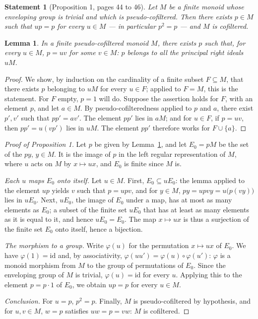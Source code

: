 \documentclass[11pt]{article}
\theoremstyle{plain}
\newtheorem*{enonce}{Statement}
\newtheorem{lemme}{Lemma}[section]
\theoremstyle{definition}
\theoremstyle{remark}
\begin{document}
\begin{enonce}[Proposition 1, pages 44 to 46]
Let $M$ be a finite monoid whose enveloping group is trivial and which is pseudo-cofiltered. Then there exists $p \in M$ such that $up = p$ for every $u \in M$ --- in particular $p^2 = p$ --- and $M$ is cofiltered.
\end{enonce}

\begin{lemme}\label{lem:158-etape1}
In a finite pseudo-cofiltered monoid $M$, there exists $p$ such that, for every $u \in M$, $p = uv$ for some $v \in M$: $p$ belongs to all the principal right ideals $uM$.
\end{lemme}

\begin{proof}
We show, by induction on the cardinality of a finite subset $F \subseteq M$, that there exists $p$ belonging to $uM$ for every $u \in F$; applied to $F = M$, this is the statement. For $F$ empty, $p = 1$ will do. Suppose the assertion holds for $F$, with an element $p$, and let $a \in M$. By pseudo-cofilteredness applied to $p$ and $a$, there exist $p', v'$ such that $pp' = av'$. The element $pp'$ lies in $aM$; and for $u \in F$, if $p = uv$, then $pp' = u(vp')$ lies in $uM$. The element $pp'$ therefore works for $F \cup \{a\}$.
\end{proof}

\begin{proof}[Proof of Proposition 1]
Let $p$ be given by Lemma~\ref{lem:158-etape1}, and let $E_0 = pM$ be the set of the $py$, $y \in M$. It is the image of $p$ in the left regular representation of $M$, where $u$ acts on $M$ by $x \mapsto ux$, and $E_0$ is finite since $M$ is.

\emph{Each $u$ maps $E_0$ onto itself.} Let $u \in M$. First, $E_0 \subseteq uE_0$: the lemma applied to the element $up$ yields $v$ such that $p = upv$, and for $y \in M$, $py = upvy = u\bigl(p(vy)\bigr)$ lies in $uE_0$. Next, $uE_0$, the image of $E_0$ under a map, has at most as many elements as $E_0$; a subset of the finite set $uE_0$ that has at least as many elements as it is equal to it, and hence $uE_0 = E_0$. The map $x \mapsto ux$ is thus a surjection of the finite set $E_0$ onto itself, hence a bijection.

\emph{The morphism to a group.} Write $\varphi(u)$ for the permutation $x \mapsto ux$ of $E_0$. We have $\varphi(1) = \mathrm{id}$ and, by associativity, $\varphi(uu') = \varphi(u) \circ \varphi(u')$: $\varphi$ is a monoid morphism from $M$ to the group of permutations of $E_0$. Since the enveloping group of $M$ is trivial, $\varphi(u) = \mathrm{id}$ for every $u$. Applying this to the element $p = p \cdot 1$ of $E_0$, we obtain $up = p$ for every $u \in M$.

\emph{Conclusion.} For $u = p$, $p^2 = p$. Finally, $M$ is pseudo-cofiltered by hypothesis, and for $u, v \in M$, $w = p$ satisfies $uw = p = vw$: $M$ is cofiltered.
\end{proof}
\end{document}
